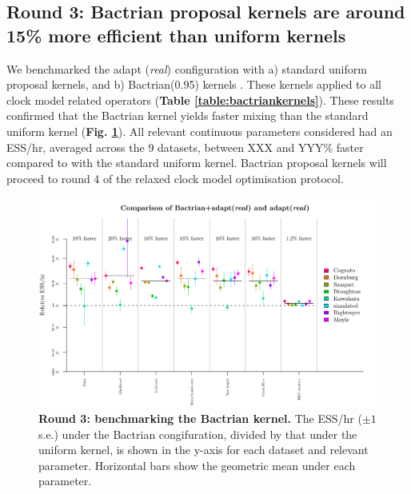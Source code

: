 \documentclass[10pt,letterpaper]{article}
\begin{document}



\subsection*{Round 3: Bactrian proposal kernels are around 15\% more efficient than uniform kernels}


We benchmarked the adapt (\textit{real}) configuration with a) standard uniform proposal kernels, and b) Bactrian(0.95) kernels \cite{yang2013searching}.
These kernels applied to all clock model related operators (\textbf{Table \ref{table:bactriankernels}}).
These results confirmed that the Bactrian kernel yields faster mixing than the standard uniform kernel (\textbf{Fig. \ref{fig:round3Results}}).
All relevant continuous parameters considered had an ESS/hr, averaged across the 9 datasets, between XXX and YYY\% faster compared to with the standard uniform kernel.
Bactrian proposal kernels will proceed to round 4 of the relaxed clock model optimisation protocol. 




\begin{figure}[!h]
\includegraphics[width=\textwidth]{benchmarking/benchmarkingVM/ESS_round3.pdf}
\caption{\textbf{Round 3: benchmarking the Bactrian kernel.}
The ESS/hr ($\pm 1$ s.e.) under the Bactrian congifuration, divided by that under the uniform kernel, is shown in the y-axis for each dataset and relevant parameter.
Horizontal bars show the geometric mean under each parameter.
 }
\label{fig:round3Results}
\end{figure}
\end{document}
